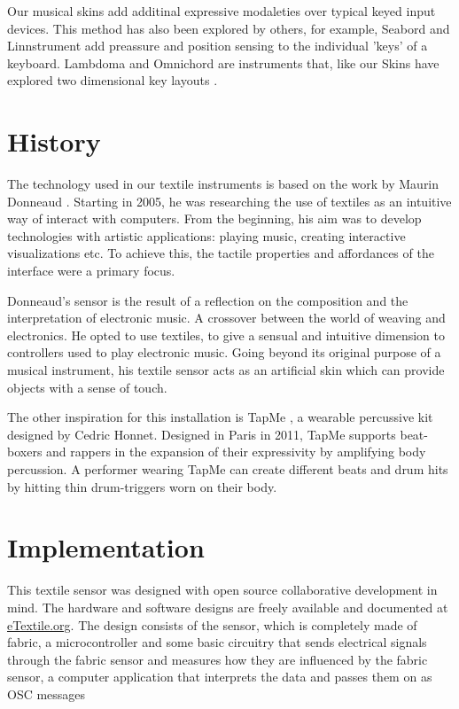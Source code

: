 \documentclass{sigchi-ext}
\begin{document}
Our musical skins add additinal expressive modaleties over typical keyed input devices. This method has also been explored by others, for example, Seabord and Linnstrument \cite{seaboard, linnstrument} add preassure and position sensing to the individual 'keys' of a keyboard. Lambdoma and Omnichord are instruments that, like our Skins have explored two dimensional key layouts \cite{lambdoma, omnichord}.


\section{History}
The technology used in our textile instruments is based on the work by Maurin Donneaud \cite{donneaud}. Starting in 2005, he was researching the use of textiles as an intuitive way of interact with computers. From the beginning, his aim was to develop technologies with artistic applications: playing music, creating interactive visualizations etc. To achieve this, the tactile properties and affordances of the interface were a primary focus.

Donneaud's sensor is the result of a reflection on the composition and the interpretation of electronic music. A crossover between the world of weaving and electronics. He opted to use textiles, to give a sensual and intuitive dimension to controllers used to play electronic music. Going beyond its original purpose of a musical instrument, his textile sensor acts as an artificial skin which can provide objects with a sense of touch.

The other inspiration for this installation is TapMe \cite{tapme}, a wearable percussive kit designed by Cedric Honnet. Designed in Paris in 2011, TapMe supports beat-boxers and rappers in the expansion of their expressivity by amplifying body percussion. A performer wearing TapMe can create different beats and drum hits by hitting thin drum-triggers worn on their body.


\section{Implementation}

This textile sensor was designed with open source collaborative development in mind. The hardware and software designs are freely available and documented at \url{eTextile.org}. The design consists of the sensor, which is completely made of fabric, a microcontroller and some basic circuitry that sends electrical signals through the fabric sensor and measures how they are influenced by the fabric sensor, a computer application that interprets the data and passes them on as OSC messages
\end{document}
